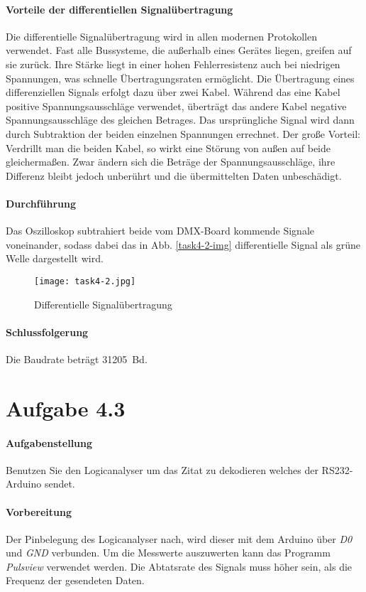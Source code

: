 \paragraph{Vorteile der differentiellen Signalübertragung}
Die differentielle Signalübertragung wird in allen modernen Protokollen verwendet. Fast alle Bussysteme, die außerhalb eines Gerätes liegen, greifen auf sie zurück. Ihre Stärke liegt in einer hohen Fehlerresistenz auch bei niedrigen Spannungen, was schnelle Übertragungsraten ermöglicht. Die Übertragung eines differenziellen Signals erfolgt dazu über zwei Kabel. Während das eine Kabel positive Spannungsausschläge verwendet, überträgt das andere Kabel negative Spannungsausschläge des gleichen Betrages. Das ursprüngliche Signal wird dann durch Subtraktion der beiden einzelnen Spannungen errechnet. Der große Vorteil: Verdrillt man die beiden Kabel, so wirkt eine Störung von außen auf beide gleichermaßen. Zwar ändern sich die Beträge der Spannungsausschläge, ihre Differenz bleibt jedoch unberührt und die übermittelten Daten unbeschädigt.

\paragraph{Durchführung}
Das Oszilloskop subtrahiert beide vom DMX-Board kommende Signale voneinander, sodass dabei das in Abb. \vref{task4-2-img} differentielle Signal als grüne Welle dargestellt wird.

\begin{figure}[!h]
	\centering
	\texttt{[image: task4-2.jpg]}
	\caption{Differentielle Signalübertragung}
	\label{task4-2-img}
\end{figure}

\paragraph{Schlussfolgerung}
Die Baudrate beträgt \SI{31205}{Bd}.

\section{Aufgabe 4.3}
\paragraph{Aufgabenstellung}
Benutzen Sie den Logicanalyser um das Zitat zu dekodieren welches der RS232-Arduino sendet.

\paragraph{Vorbereitung}
Der Pinbelegung des Logicanalyser nach, wird dieser mit dem Arduino über \textit{D0} und \textit{GND} verbunden. Um die Messwerte auszuwerten kann das Programm \textit{Pulsview} verwendet werden. Die Abtatsrate des Signals muss höher sein, als die Frequenz der gesendeten Daten.

